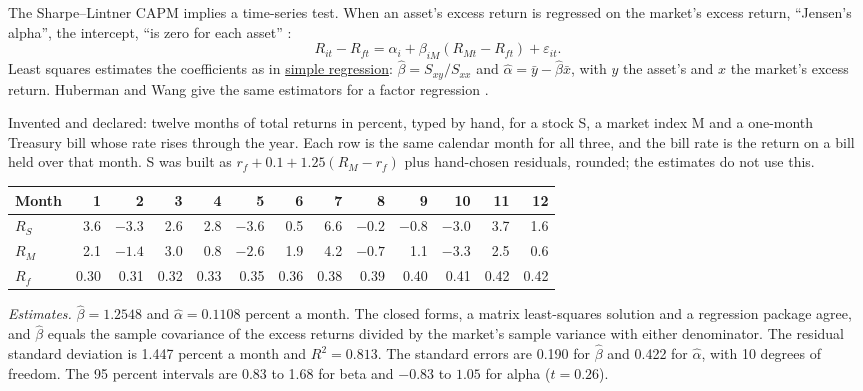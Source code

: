 \begin{qfmethod}\label{meth:capm-regression}
 The Sharpe--Lintner CAPM implies a time-series test. When an asset's excess return is regressed on the market's excess return, ``Jensen's alpha'', the intercept, ``is zero for each asset'' \citep[\emph{JEP} 18(3), 2004, p.~32]{capm-theory-evidence-2004}:
\[ R_{it}-R_{ft}=\alpha_i+\beta_{iM}(R_{Mt}-R_{ft})+\varepsilon_{it}. \] Least squares estimates the coefficients as in \hyperref[meth:simple-regression-estimation]{simple regression}: $\hat\beta=S_{xy}/S_{xx}$ and $\hat\alpha=\bar y-\hat\beta\bar x$, with $y$ the asset's and $x$ the market's excess return. Huberman and Wang give the same estimators for a factor regression \citep[FRBNY Staff Report 216, August 2005, sec.~7, eqs.~(14)--(17)]{arbitrage-pricing-review-2005}.

 Invented and declared: twelve months of total returns in percent, typed by hand, for a stock S, a market index M and a one-month Treasury bill whose rate rises through the year. Each row is the same calendar month for all three, and the bill rate is the return on a bill held over that month. S was built as $r_f+0.1+1.25(R_M-r_f)$ plus hand-chosen residuals, rounded; the estimates do not use this.

\begin{center}\small
\begin{tabular}{@{}lrrrrrrrrrrrr@{}}
\toprule
Month & 1 & 2 & 3 & 4 & 5 & 6 & 7 & 8 & 9 & 10 & 11 & 12 \\
\midrule
$R_S$ & 3.6 & $-3.3$ & 2.6 & 2.8 & $-3.6$ & 0.5 & 6.6 & $-0.2$ & $-0.8$ & $-3.0$ & 3.7 & 1.6 \\
$R_M$ & 2.1 & $-1.4$ & 3.0 & 0.8 & $-2.6$ & 1.9 & 4.2 & $-0.7$ & 1.1 & $-3.3$ & 2.5 & 0.6 \\
$R_f$ & 0.30 & 0.31 & 0.32 & 0.33 & 0.35 & 0.36 & 0.38 & 0.39 & 0.40 & 0.41 & 0.42 & 0.42 \\
\bottomrule
\end{tabular}
\end{center}

 \emph{Estimates.} $\hat\beta=1.2548$ and $\hat\alpha=0.1108$ percent a month. The closed forms, a matrix least-squares solution and a regression package agree, and $\hat\beta$ equals the sample covariance of the excess returns divided by the market's sample variance with either denominator. The residual standard deviation is 1.447 percent a month and $R^2=0.813$. The standard errors are 0.190 for $\hat\beta$ and 0.422 for $\hat\alpha$, with 10 degrees of freedom. The 95 percent intervals are 0.83 to 1.68 for beta and $-0.83$ to $1.05$ for alpha ($t=0.26$).


\end{qfmethod}
